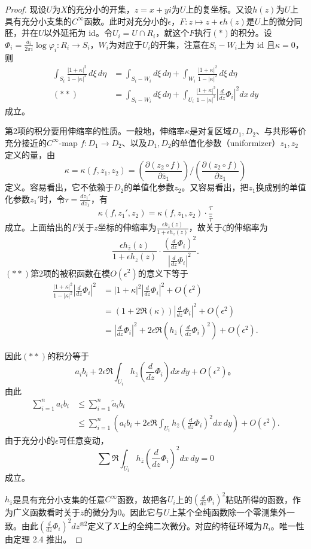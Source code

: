 \begin{proof}
现设$U$为$X$的充分小的开集，$z=x+yi$为$U$上的复坐标。又设$h(z)$为$U$上具有充分小支集的$C^\infty$函数。此时对充分小的$\epsilon$，$F\colon z\mapsto z+\epsilon h(z)$是$U$上的微分同胚，并在$U$以外延拓为 id。令$U_i=U\cap R_i$，就这个$F$执行$(\ast)$的积分。设$\Phi_i=\frac{a_i}{2\pi i}\log\varphi_i\colon R_i\to S_i$，$W_i$为对应于$U_i$的开集，注意在$S_i-W_i$上为 id 且$\kappa=0$，则
\[
\begin{aligned}
\int_{S_i}\frac{|1+\kappa|^2}{1-|\kappa|^2}\,d\xi\,d\eta
&=\int_{S_i-W_i}d\xi\,d\eta+\int_{W_i}\frac{|1+\kappa|^2}{1-|\kappa|^2}\,d\xi\,d\eta\\
(\ast\ast)\qquad
&=\int_{S_i-W_i}d\xi\,d\eta+\int_{U_i}\frac{|1+\kappa|^2}{1-|\kappa|^2}
 \left|\frac{d}{dz}\Phi_i\right|^2dx\,dy
\end{aligned}
\]
成立。

第2项的积分要用伸缩率的性质。一般地，伸缩率$\kappa$是对复区域$D_1,D_2$、与共形等价充分接近的$C^\infty$-map $f\colon D_1\to D_2$、以及$D_1,D_2$的单值化参数（uniformizer）$z_1,z_2$定义的量，由
\[
\kappa=\kappa(f,z_1,z_2)
=\left(\frac{\partial(z_2\circ f)}{\partial\bar z_1}\right)
\Big/\left(\frac{\partial(z_2\circ f)}{\partial z_1}\right)
\]
定义。容易看出，它不依赖于$D_2$的单值化参数$z_2$。又容易看出，把$z_1$换成别的单值化参数$z_1'$时，令$\tau=\frac{dz_1'}{dz_1}$，有
\[
\kappa(f,z_1',z_2)=\kappa(f,z_1,z_2)\cdot\frac{\tau}{\bar\tau}
\]
成立。上面给出的$F$关于$z$坐标的伸缩率为$\frac{\epsilon h_{\bar z}(z)}{1+\epsilon h_z(z)}$，故关于$\zeta$的伸缩率为
\[
\frac{\epsilon h_{\bar z}(z)}{1+\epsilon h_z(z)}
\cdot\frac{\left(\frac{d}{dz}\Phi_i\right)^2}
{\left|\frac{d}{dz}\Phi_i\right|^2}.
\]
$(\ast\ast)$第2项的被积函数在模$O(\epsilon^2)$的意义下等于
\[
\begin{aligned}
\frac{|1+\kappa|^2}{1-|\kappa|^2}\left|\frac{d}{dz}\Phi_i\right|^2
&=|1+\kappa|^2\left|\frac{d}{dz}\Phi_i\right|^2+O(\epsilon^2)\\
&=(1+2\Re(\kappa))\left|\frac{d}{dz}\Phi_i\right|^2+O(\epsilon^2)\\
&=\left|\frac{d}{dz}\Phi_i\right|^2
 +2\epsilon\Re\left(h_{\bar z}\left(\frac{d}{dz}\Phi_i\right)^2\right)+O(\epsilon^2).
\end{aligned}
\]

因此$(\ast\ast)$的积分等于
\[
a_ib_i+2\epsilon\Re\int_{U_i}h_{\bar z}
\left(\frac{d}{dz}\Phi_i\right)dx\,dy+O(\epsilon^2)\text{。}
\]
由此
\[
\begin{aligned}
\sum_{i=1}^n a_ib_i&\le\sum_{i=1}^n\tilde a_ib_i\\
&\le\sum_{i=1}^n\left(a_ib_i+2\epsilon\Re\int_{U_i}h_{\bar z}
 \left(\frac{d}{dz}\Phi_i\right)^2dx\,dy\right)+O(\epsilon^2).
\end{aligned}
\]
由于充分小的$\epsilon$可任意变动，
\[
\sum\Re\int_{U_i}h_{\bar z}
\left(\frac{d}{dz}\Phi_i\right)^2dx\,dy=0
\]
成立。

$h_{\bar z}$是具有充分小支集的任意$C^\infty$函数，故把各$U_i$上的$\left(\frac{d}{dz}\Phi_i\right)^2$粘贴所得的函数，作为广义函数看时关于$\bar z$的微分为$0$。因此它与$U$上某个全纯函数除一个零测集外一致。由此$\left(\frac{d}{dz}\Phi_i\right)^2dz^{\otimes2}$定义了$X$上的全纯二次微分。对应的特征环域为$R_i$。唯一性由定理 2.4 推出。
\end{proof}


